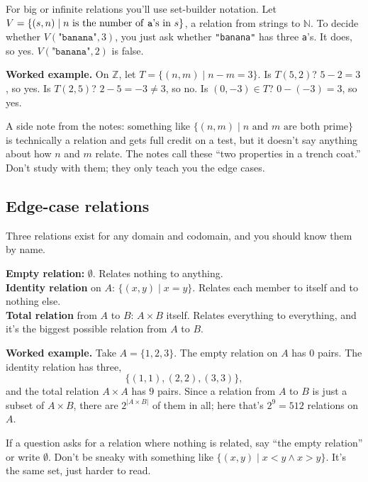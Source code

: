 For big or infinite relations you'll use set-builder notation. Let $V=\{(s,n)\mid n \text{ is the number of \texttt{a}'s in } s\}$, a relation from strings to $\mathbb{N}$. To decide whether $V(\texttt{"banana"},3)$, you just ask whether \texttt{"banana"} has three \texttt{a}'s. It does, so yes. $V(\texttt{"banana"},2)$ is false.

\textbf{Worked example.} On $\mathbb{Z}$, let $T=\{(n,m)\mid n-m=3\}$. Is $T(5,2)$? $5-2=3$, so yes. Is $T(2,5)$? $2-5=-3\neq 3$, so no. Is $(0,-3)\in T$? $0-(-3)=3$, so yes.

A side note from the notes: something like $\{(n,m)\mid n \text{ and } m \text{ are both prime}\}$ is technically a relation and gets full credit on a test, but it doesn't say anything about how $n$ and $m$ relate. The notes call these ``two properties in a trench coat.'' Don't study with them; they only teach you the edge cases.

\subsection{Edge-case relations}

Three relations exist for any domain and codomain, and you should know them by name.

\begin{notebox}
\textbf{Empty relation:} $\emptyset$. Relates nothing to anything.\\
\textbf{Identity relation} on $A$: $\{(x,y)\mid x=y\}$. Relates each member to itself and to nothing else.\\
\textbf{Total relation} from $A$ to $B$: $A\times B$ itself. Relates everything to everything, and it's the biggest possible relation from $A$ to $B$.
\end{notebox}

\textbf{Worked example.} Take $A=\{1,2,3\}$. The empty relation on $A$ has $0$ pairs. The identity relation has three,
\[\{(1,1),(2,2),(3,3)\},\]
and the total relation $A\times A$ has $9$ pairs. Since a relation from $A$ to $B$ is just a subset of $A\times B$, there are $2^{|A\times B|}$ of them in all; here that's $2^9=512$ relations on $A$.

If a question asks for a relation where nothing is related, say ``the empty relation'' or write $\emptyset$. Don't be sneaky with something like $\{(x,y)\mid x<y\land x>y\}$. It's the same set, just harder to read.

